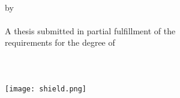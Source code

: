 \begin{titlepage}
	\setcounter{page}{1}
	\onehalfspacing
	\vspace*{\fill}
    \begin{center}
    	\vspace{2em}
        \textbf{\CAPTitle}\\
		\vspace{2em}
		by\\
        \Author \\  
      	\vspace{2em}
        A thesis submitted in partial fulfillment of the\\ 
        requirements for the degree of\\
		\vspace{2em}
        \Degree\\
        \vspace{2em}
        \vspace{5em}
        \University\\
        \Year\\
        \vspace{.5em}
        \texttt{[image: shield.png]}
    \end{center}
	\vspace*{\fill}
\end{titlepage}